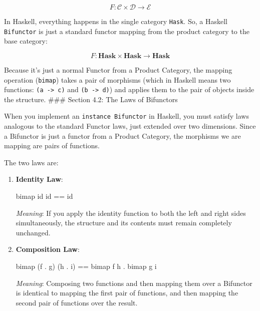 \documentclass[
]{article}
\newenvironment{Shaded}{}{}
\newcommand{\FunctionTok}[1]{\textcolor[rgb]{0.02,0.16,0.49}{#1}}
\newcommand{\NormalTok}[1]{#1}
\newcommand{\OperatorTok}[1]{\textcolor[rgb]{0.40,0.40,0.40}{#1}}
\begin{document}
\[F: \mathcal{C} \times \mathcal{D} \to \mathcal{E}\]

In Haskell, everything happens in the single category \texttt{Hask}. So,
a Haskell \texttt{Bifunctor} is just a standard functor mapping from the
product category to the base category:

\[F: \mathbf{Hask} \times \mathbf{Hask} \to \mathbf{Hask}\]

Because it's just a normal Functor from a Product Category, the mapping
operation (\texttt{bimap}) takes a pair of morphisms (which in Haskell
means two functions: \texttt{(a\ -\textgreater{}\ c)} and
\texttt{(b\ -\textgreater{}\ d)}) and applies them to the pair of
objects inside the structure. \#\#\# Section 4.2: The Laws of Bifunctors

When you implement an \texttt{instance\ Bifunctor} in Haskell, you must
satisfy laws analogous to the standard Functor laws, just extended over
two dimensions. Since a Bifunctor is just a functor from a Product
Category, the morphisms we are mapping are pairs of functions.

The two laws are:

\begin{enumerate}
\def\labelenumi{\arabic{enumi}.}
\item
  \textbf{Identity Law}:

\begin{Shaded}
\begin{Highlighting}[]
\NormalTok{bimap }\FunctionTok{id} \FunctionTok{id} \OperatorTok{==} \FunctionTok{id}
\end{Highlighting}
\end{Shaded}

  \emph{Meaning}: If you apply the identity function to both the left
  and right sides simultaneously, the structure and its contents must
  remain completely unchanged.
\item
  \textbf{Composition Law}:

\begin{Shaded}
\begin{Highlighting}[]
\NormalTok{bimap (f }\OperatorTok{.}\NormalTok{ g) (h }\OperatorTok{.}\NormalTok{ i) }\OperatorTok{==}\NormalTok{ bimap f h }\OperatorTok{.}\NormalTok{ bimap g i}
\end{Highlighting}
\end{Shaded}

  \emph{Meaning}: Composing two functions and then mapping them over a
  Bifunctor is identical to mapping the first pair of functions, and
  then mapping the second pair of functions over the result.
\end{enumerate}
\end{document}

